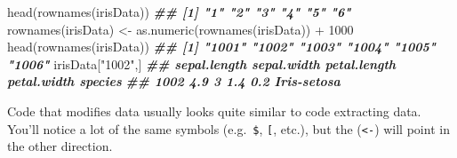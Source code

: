 \documentclass[
  12pt,
]{krantz}
\makeatletter
\newenvironment{Shaded}{\begin{snugshade}}{\end{snugshade}}
\newcommand{\AttributeTok}[1]{\textcolor[rgb]{0.61,0.61,0.61}{#1}}
\newcommand{\DecValTok}[1]{\textcolor[rgb]{0.06,0.06,0.06}{#1}}
\newcommand{\DocumentationTok}[1]{\textcolor[rgb]{0.37,0.37,0.37}{\textbf{\textit{#1}}}}
\newcommand{\FunctionTok}[1]{\textcolor[rgb]{0,0,0}{#1}}
\newcommand{\NormalTok}[1]{#1}
\newcommand{\OtherTok}[1]{\textcolor[rgb]{0.37,0.37,0.37}{#1}}
\newcommand{\SpecialCharTok}[1]{\textcolor[rgb]{0,0,0}{#1}}
\newcommand{\StringTok}[1]{\textcolor[rgb]{0.5,0.5,0.5}{#1}}
\newenvironment{kframe}{%
\medskip{}
\setlength{\fboxsep}{.8em}
 \def\at@end@of@kframe{}%
 \ifinner\ifhmode%
  \def\at@end@of@kframe{\end{minipage}}%
  \begin{minipage}{\columnwidth}%
 \fi\fi%
 \def\FrameCommand##1{\hskip\@totalleftmargin \hskip-\fboxsep
 \colorbox{shadecolor}{##1}\hskip-\fboxsep
     \hskip-\linewidth \hskip-\@totalleftmargin \hskip\columnwidth}%
 \MakeFramed {\advance\hsize-\width
   \@totalleftmargin\z@ \linewidth\hsize
   \@setminipage}}%
 {\par\unskip\endMakeFramed%
 \at@end@of@kframe}
\renewenvironment{Shaded}{\begin{kframe}}{\end{kframe}}
\makeatother
\begin{document}
\begin{Shaded}
\begin{Highlighting}[]
\FunctionTok{head}\NormalTok{(}\FunctionTok{rownames}\NormalTok{(irisData))}
\DocumentationTok{\#\# [1] "1" "2" "3" "4" "5" "6"}
\FunctionTok{rownames}\NormalTok{(irisData) }\OtherTok{\textless{}{-}} \FunctionTok{as.numeric}\NormalTok{(}\FunctionTok{rownames}\NormalTok{(irisData)) }\SpecialCharTok{+} \DecValTok{1000}
\FunctionTok{head}\NormalTok{(}\FunctionTok{rownames}\NormalTok{(irisData))}
\DocumentationTok{\#\# [1] "1001" "1002" "1003" "1004" "1005" "1006"}
\NormalTok{irisData[}\StringTok{"1002"}\NormalTok{,]}
\DocumentationTok{\#\#      sepal.length sepal.width petal.length petal.width     species}
\DocumentationTok{\#\# 1002          4.9           3          1.4         0.2 Iris{-}setosa}
\end{Highlighting}
\end{Shaded}

Code that modifies data usually looks quite similar to code extracting data. You'll notice a lot of the same symbols (e.g.~\texttt{\$}, \texttt{{[}}, etc.), but the (\texttt{\textless{}-}) will point in the other direction.

\begin{Shaded}
\end{Shaded}
\end{document}
